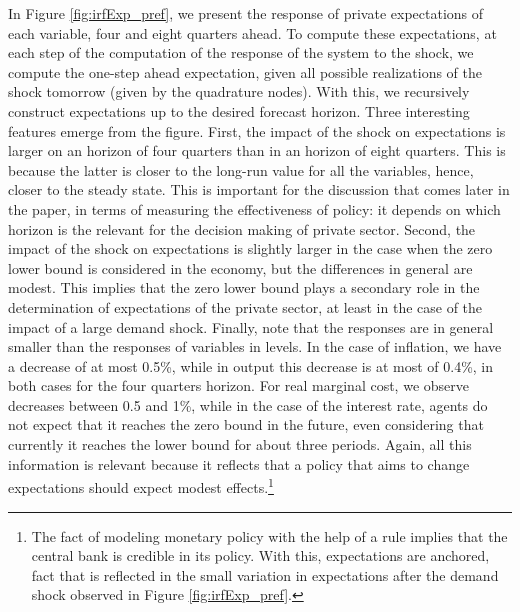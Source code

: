 \documentclass[11pt]{article}
\numberwithin{equation}{section}
\begin{document}
In Figure \ref{fig:irfExp_pref}, we present the response of private expectations of each variable, four and eight quarters ahead. To compute these expectations, at each step of the computation of the response of the system to the shock, we compute the one-step ahead expectation, given all possible realizations of the shock tomorrow (given by the quadrature nodes). With this, we recursively construct expectations up to the desired forecast horizon. Three interesting features emerge from the figure. First, the impact of the shock on expectations is larger on an horizon of four quarters than in an horizon of eight quarters. This is because the latter is closer to the long-run value for all the variables, hence, closer to the steady state. This is important for the discussion that comes later in the paper, in terms of measuring the effectiveness of policy: it depends on which horizon is the relevant for the decision making of private sector. Second, the impact of the shock on expectations is slightly larger in the case when the zero lower bound is considered in the economy, but the differences in general are modest. This implies that the zero lower bound plays a secondary role in the determination of expectations of the private sector, at least in the case of the impact of a large demand shock. Finally, note that the responses are in general smaller than the responses of variables in levels. In the case of inflation, we have a decrease of at most 0.5\%, while in output this decrease is at most of 0.4\%, in both cases for the four quarters horizon. For real marginal cost, we observe decreases between 0.5 and 1\%, while in the case of the interest rate, agents do not expect that it reaches the zero bound in the future, even considering that currently it reaches the lower bound for about three periods. Again, all this information is relevant because it reflects that a policy that aims to change expectations should expect modest effects.\footnote{The fact of modeling monetary policy with the help of a rule implies that the central bank is credible in its policy. With this, expectations are anchored, fact that is reflected in the small variation in expectations after the demand shock observed in Figure \ref{fig:irfExp_pref}.}
\end{document}
